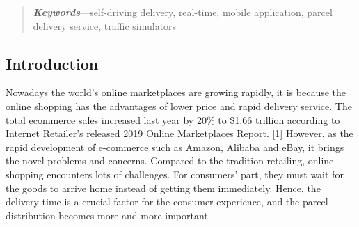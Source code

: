 \documentclass[12pt]{ksthesis}
\begin{document}
\begin{preliminary}
\begin{abstract}
\emph{\textbf{Keywords}}---self-driving delivery, real-time, mobile application, parcel delivery service, traffic simulators

\end{abstract}

\begin{acknowledgements}
\Thesisspace {\large }

\end{acknowledgements}

\tableofcontents \listoffigures\clearpage

\end{preliminary}
\begin{thesis}\large {
\chapter{Introduction} \label{Chap:Introduction}

Nowadays the world’s online marketplaces are growing rapidly, it is because the online shopping has the advantages of lower price and rapid delivery service. The total ecommerce sales increased last year by 20\% to \$1.66 trillion according to Internet Retailer’s released 2019 Online Marketplaces Report. [1] However, as the rapid development of e-commerce such as Amazon, Alibaba and eBay, it brings the novel problems and concerns. Compared to the tradition retailing, online shopping encounters lots of challenges. For consumers’ part, they must wait for the goods to arrive home instead of getting them immediately. Hence, the delivery time is a crucial factor for the consumer experience, and the parcel distribution becomes more and more important. 




}
\end{thesis}
\end{document}
